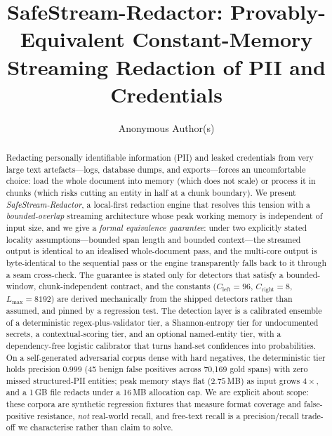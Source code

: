 \documentclass[runningheads]{llncs}
\newcommand{\Lmax}{L_{\max}}
\newcommand{\Cleft}{C_{\mathrm{left}}}
\newcommand{\Cright}{C_{\mathrm{right}}}
\begin{document}
\title{SafeStream-Redactor: Provably-Equivalent Constant-Memory Streaming
Redaction of PII and Credentials}


\author{Anonymous Author(s)}

\maketitle

\begin{abstract}
Redacting personally identifiable information (PII) and leaked credentials from
very large text artefacts---logs, database dumps, and exports---forces an
uncomfortable choice: load the whole document into memory (which does not scale)
or process it in chunks (which risks cutting an entity in half at a chunk
boundary). We present \emph{SafeStream-Redactor}, a local-first redaction engine
that resolves this tension with a \emph{bounded-overlap} streaming architecture
whose peak working memory is independent of input size, and we give a
\emph{formal equivalence guarantee}: under two explicitly stated locality
assumptions---bounded span length and bounded context---the streamed output is
identical to an idealised whole-document pass, and the multi-core output is
byte-identical to the sequential pass or the engine transparently falls back to
it through a seam cross-check. The guarantee is stated only for detectors that
satisfy a bounded-window, chunk-independent contract, and the constants
($\Cleft=96$, $\Cright=8$, $\Lmax=8192$) are derived mechanically from the
shipped detectors rather than assumed, and pinned by a regression test. The detection layer is a calibrated ensemble of a deterministic
regex-plus-validator tier, a Shannon-entropy tier for undocumented secrets, a
contextual-scoring tier, and an optional named-entity tier, with a
dependency-free logistic calibrator that turns hand-set confidences into
probabilities. On a self-generated adversarial corpus dense with hard
negatives, the deterministic tier holds precision $0.999$ (45 benign false
positives across 70{,}169 gold spans) with zero missed structured-PII entities;
peak memory stays flat ($2.75$\,MB) as input grows $4\times$, and a 1\,GB file
redacts under a 16\,MB allocation cap. We are explicit about scope: these
corpora are synthetic regression fixtures that measure format coverage and
false-positive resistance, \emph{not} real-world recall, and free-text recall is
a precision/recall trade-off we characterise rather than claim to solve.
\end{abstract}
\end{document}

